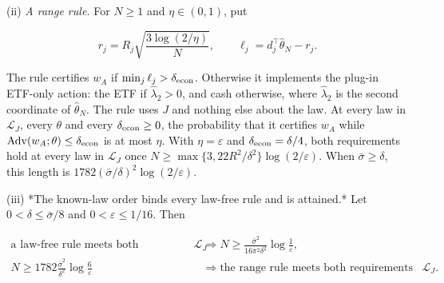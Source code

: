 \documentclass[11pt]{article}
\begin{document}
(ii) \emph{A range rule.} For \(N\geq1\) and
\(\eta\in(0,1)\), put

\begin{equation*}
r_j=R_j\sqrt{\frac{3\log(2/\eta)}{N}},\qquad
\ell_j=d_j^\top\widehat\theta_N-r_j.\tag{54}\label{eq:54}
\end{equation*}

The rule certifies \(w_A\) if
\(\min_j\ell_j>\delta_{\rm econ}\). Otherwise it implements
the plug-in ETF-only action: the ETF if
\(\widehat\lambda_{2}>0\), and cash otherwise, where
\(\widehat\lambda_{2}\) is the second coordinate of
\(\widehat\theta_N\). The rule uses \(J\) and nothing else
about the law. At every law in \(\mathcal L_J\), every
\(\theta\) and every \(\delta_{\rm econ}\geq0\), the
probability that it certifies \(w_A\) while
\(\operatorname{Adv}(w_A;\theta)\leq\delta_{\rm econ}\) is
at most \(\eta\). With \(\eta=\varepsilon\) and
\(\delta_{\rm econ}=\delta/4\), both requirements hold at
every law in \(\mathcal L_J\) once
\(N\geq\max\{3,22R^2/\delta^2\}\log(2/\varepsilon)\). When
\(\bar\sigma\geq\delta\), this length is
\(1782(\bar\sigma/\delta)^2\log(2/\varepsilon)\).

(iii) *The known-law order binds every law-free rule and is
attained.* Let \(0<\delta\leq\bar\sigma/8\) and
\(0<\varepsilon\leq1/16\). Then

\begin{equation*}
\begin{aligned}
\text{a law-free rule meets both requirements on }\mathcal L_J
&\Longrightarrow
N\geq\frac{\bar\sigma^2}{16\pi^2\delta^2}
      \log\frac1\varepsilon,\\
N\geq1782\frac{\bar\sigma^2}{\delta^2}
      \log\frac6\varepsilon
&\Longrightarrow
\text{the range rule meets both requirements on }\mathcal L_J.
\end{aligned}\tag{55}\label{eq:55}
\end{equation*}
\end{document}
